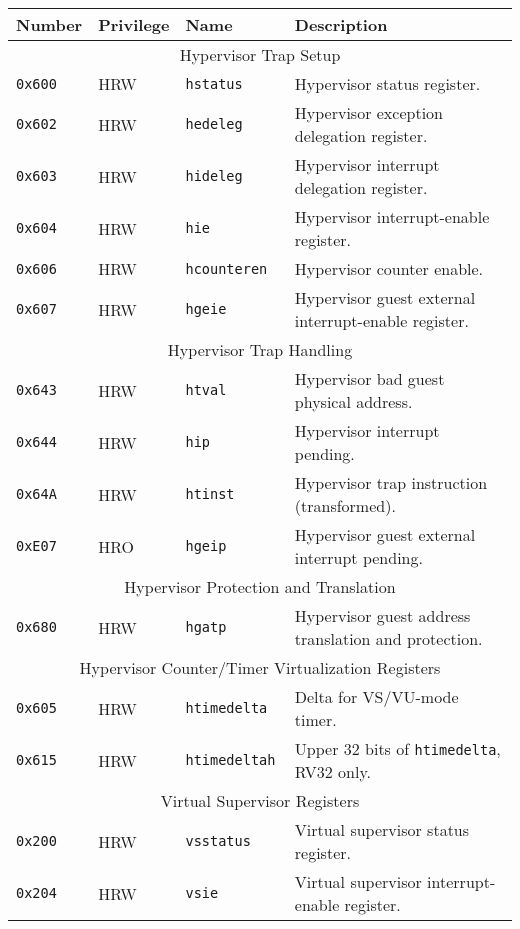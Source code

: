 \begin{table}[htb!]
\begin{center}
\begin{tabular}{|l|l|l|l|}
\hline
Number    & Privilege & Name & Description \\
\hline
\multicolumn{4}{|c|}{Hypervisor Trap Setup} \\
\hline
\hline
\tt 0x600 & HRW  &\tt hstatus    & Hypervisor status register. \\
\tt 0x602 & HRW  &\tt hedeleg    & Hypervisor exception delegation register. \\
\tt 0x603 & HRW  &\tt hideleg    & Hypervisor interrupt delegation register. \\
\tt 0x604 & HRW  &\tt hie        & Hypervisor interrupt-enable register. \\
\tt 0x606 & HRW  &\tt hcounteren & Hypervisor counter enable. \\
\tt 0x607 & HRW  &\tt hgeie      & Hypervisor guest external interrupt-enable register. \\
\hline
\multicolumn{4}{|c|}{Hypervisor Trap Handling} \\
\hline
\tt 0x643 & HRW  &\tt htval      & Hypervisor bad guest physical address. \\
\tt 0x644 & HRW  &\tt hip        & Hypervisor interrupt pending. \\
\tt 0x64A & HRW  &\tt htinst     & Hypervisor trap instruction (transformed). \\
\tt 0xE07 & HRO  &\tt hgeip      & Hypervisor guest external interrupt pending. \\
\hline
\multicolumn{4}{|c|}{Hypervisor Protection and Translation} \\
\hline
\tt 0x680 & HRW  &\tt hgatp      & Hypervisor guest address translation and protection. \\
\hline
\multicolumn{4}{|c|}{Hypervisor Counter/Timer Virtualization Registers} \\
\hline
\tt 0x605 & HRW  &\tt htimedelta   & Delta for VS/VU-mode timer. \\
\tt 0x615 & HRW  &\tt htimedeltah  & Upper 32 bits of {\tt htimedelta}, RV32 only. \\
\hline
\multicolumn{4}{|c|}{Virtual Supervisor Registers} \\
\hline
\tt 0x200 & HRW  &\tt vsstatus   & Virtual supervisor status register. \\
\tt 0x204 & HRW  &\tt vsie       & Virtual supervisor interrupt-enable register. \\

\end{tabular}
\end{center}
\end{table}
